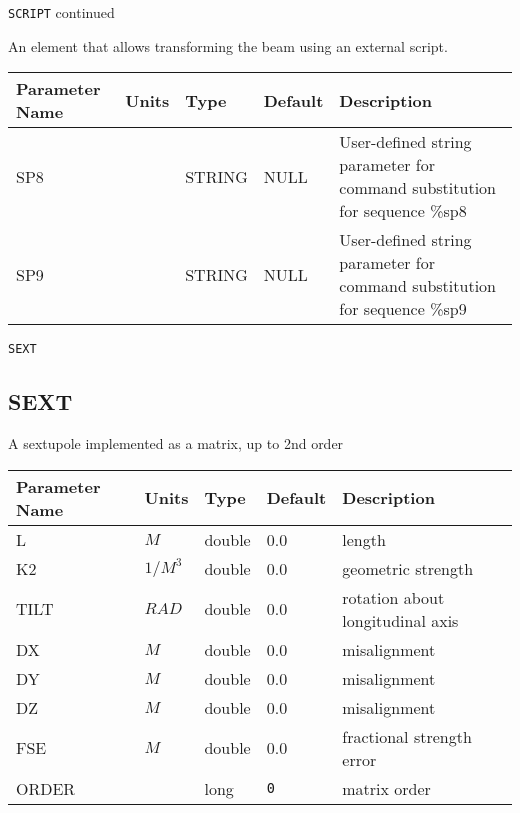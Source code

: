\begin{latexonly}
\newpage
\begin{center}{\Large\verb|SCRIPT| continued}\end{center}
\end{latexonly}
An element that allows transforming the beam using an external script.
\\
\begin{tabular}{|l|l|l|l|p{\descwidth}|} \hline
Parameter Name & Units & Type & Default & Description \\ \hline 
SP8 &  & STRING &   NULL            & User-defined string parameter for command substitution for sequence \%sp8  \\ \hline 
SP9 &  & STRING &   NULL            & User-defined string parameter for command substitution for sequence \%sp9  \\ \hline 
\end{tabular}

\begin{latexonly}
\newpage
\begin{center}{\Large\verb|SEXT|}\end{center}
\end{latexonly}\subsection{SEXT}
A sextupole implemented as a matrix, up to 2nd order
\\
\begin{tabular}{|l|l|l|l|p{\descwidth}|} \hline
Parameter Name & Units & Type & Default & Description \\ \hline 
L & $M$ & double &  0.0 & length  \\ \hline 
K2 & $1/M^{3}$ & double &  0.0 & geometric strength  \\ \hline 
TILT & $RAD$ & double &  0.0 & rotation about longitudinal axis  \\ \hline 
DX & $M$ & double &  0.0 & misalignment  \\ \hline 
DY & $M$ & double &  0.0 & misalignment  \\ \hline 
DZ & $M$ & double &  0.0 & misalignment  \\ \hline 
FSE & $M$ & double &  0.0 & fractional strength error  \\ \hline 
ORDER &  & long &  \verb|0| & matrix order  \\ \hline 
\end{tabular}

